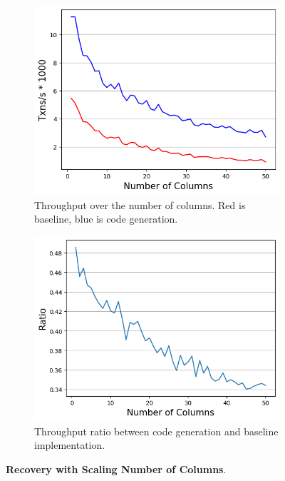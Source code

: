 \documentclass[12pt]{cmuthesis}
\begin{document}
\begin{figure}[ht!]
\centering
\begin{subfigure}{.44\textwidth}
 \centering
 \includegraphics[width=1.0\textwidth]{images/ColumnRecovery.png}
 \caption{Throughput over the number of columns. Red is baseline, blue is code generation.}
  \label{fig:col_recovery_throughput}
\end{subfigure}%
\begin{subfigure}{.45\textwidth}
 \centering
 \includegraphics[width=1.0\textwidth]{images/ColumnRecoveryRatio.png}
 \caption{Throughput ratio between code generation and baseline implementation.}
  \label{fig:col_recovery_ratio}
\end{subfigure}
\caption{\textbf{Recovery with Scaling Number of Columns}.}
\label{fig:col_insert_recovery_throughput}
\end{figure}
\end{document}
